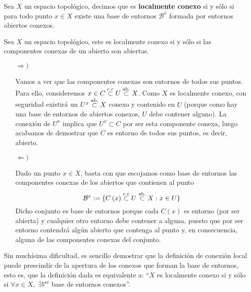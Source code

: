 \begin{defi}
Sea $X$ un espacio topológico, decimos que es \textbf{localmente conexo} si y sólo si para todo punto $x \in X$ existe una base de entornos $\mathcal{B}^x$ formada por entornos abiertos conexos.
\end{defi}

\begin{prop}
Sea $X$ un espacio topológico, este es localmente conexo si y sólo si las componentes conexas de un abierto son abiertas.
\end{prop}
\begin{demo}
\begin{itemize}
    \item[$\Rightarrow)$] 
    
	Vamos a ver que las componentes conexas son entornos de todos sus puntos. Para ello, consideremos $x \in C \stackrel{\text{c.c}}{\subset} U \stackrel{\text{ab.}}{\subset} X$. Como $X$ es localmente conexo, con seguridad existirá un $U^x \stackrel{\text{ab.}}{\subset} X$ conexo y contenido en $U$ (porque como hay una base de entornos de abiertos conexos, $U$ debe contener alguno). La conexión de $U^x$ implica que $U^x \subset C$ por ser esta componente conexa, luego acabamos de demostrar que $C$ es entorno de todos sus puntos, es decir, abierto. 
	
    \item[$\Leftarrow)$]
    
    Dado un punto $x\in X$, basta con que escojamos como base de entornos las componentes conexas de los abiertos que contienen al punto
    \[
    \mathcal{B}^x := \{C\left( x \right) \stackrel{\text{c.c}}{\subset} U \stackrel{\text{ab.}}{\subset} X : x \in U\}			\]
    Dicho conjunto es base de entornos porque cada $C(x)$ es entorno (por ser abierta) y cualquier otro entorno debe contener a alguna, puesto que por ser entorno contendrá algún abierto que contenga al punto y, en consecuencia, alguna de las componentes conexas del conjunto.
\end{itemize}
\end{demo}

\begin{obs}
Sin muchísima dificultad, es sencillo demostrar que la definición de conexión local puede prescindir de la apertura de los conexos que forman la base de entornos, esto es, que la definición dada es equivalente a: ``$X$ es localmente conexo si y sólo si $\forall x \in X,\ \exists \mathcal{V}^x$ base de entornos conexos''.
\end{obs}

